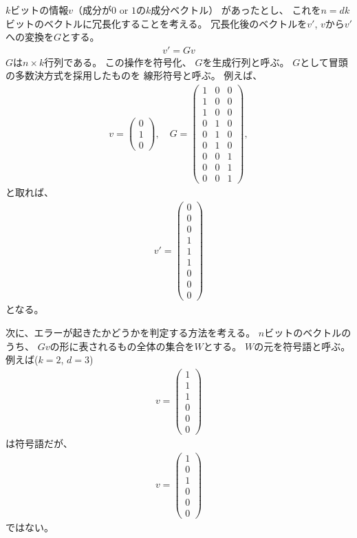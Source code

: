 \documentclass[]{ltjsarticle}
\begin{document}
$k$ビットの情報$v$（成分が$0$ or $1$の$k$成分ベクトル）
があったとし、
これを$n = dk$ビットのベクトルに冗長化することを考える。
冗長化後のベクトルを$v'$, $v$から$v'$への変換を$G$とする。 
\begin{align}
    v' = Gv
\end{align}
$G$は$n \times k$行列である。
この操作を符号化、
$G$を生成行列と呼ぶ。
$G$として冒頭の多数決方式を採用したものを
線形符号と呼ぶ。
例えば、
\begin{align}
    v 
    =
    \begin{pmatrix}
        0 \\ 1 \\ 0
    \end{pmatrix},
    \quad 
    G
    =
    \begin{pmatrix}
        1 & 0 & 0 \\
        1 & 0 & 0 \\
        1 & 0 & 0 \\
        0 & 1 & 0 \\
        0 & 1 & 0 \\
        0 & 1 & 0 \\
        0 & 0 & 1 \\
        0 & 0 & 1 \\
        0 & 0 & 1
    \end{pmatrix},
\end{align}
と取れば、
\begin{align}
    v' = 
    \begin{pmatrix}
        0 \\ 0 \\ 0 \\ 
        1 \\ 1 \\ 1 \\ 
        0 \\ 0 \\ 0
    \end{pmatrix}
\end{align}
となる。

次に、エラーが起きたかどうかを判定する方法を考える。
$n$ビットのベクトルのうち、
$Gv$の形に表されるもの全体の集合を$W$とする。
$W$の元を符号語と呼ぶ。
例えば($k=2$, $d=3$)
\begin{align}
    v = 
    \begin{pmatrix}
    1 \\ 1 \\ 1 \\ 0 \\ 0 \\ 0    
    \end{pmatrix}
\end{align}
は符号語だが、
\begin{align}
    v = 
    \begin{pmatrix}
    1 \\ 0 \\ 1 \\ 0 \\ 0 \\ 0
    \end{pmatrix}
\end{align}
ではない。
\end{document}

